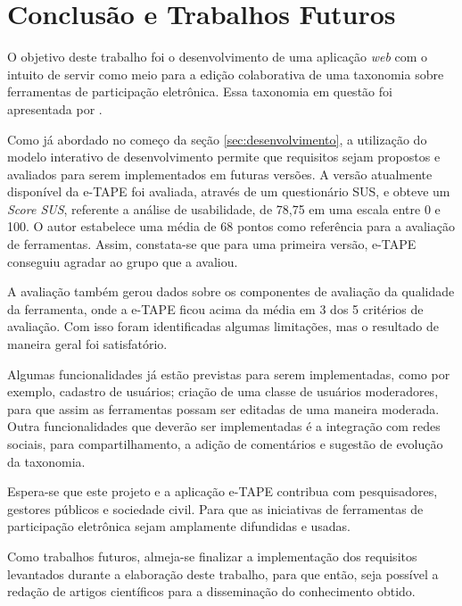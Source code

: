 \chapter[Conclusão e Trabalhos Futuros]{Conclusão e Trabalhos Futuros}
\label{cap:cap5}

O objetivo deste trabalho foi o desenvolvimento de uma aplicação \textit{web} com o intuito de servir como meio para a edição colaborativa de uma taxonomia
sobre ferramentas de participação eletrônica. Essa taxonomia em questão foi apresentada por .

\par
Como já abordado no começo da seção \ref{sec:desenvolvimento}, a utilização do modelo interativo de desenvolvimento permite que requisitos sejam propostos e avaliados para serem
implementados em futuras versões. A versão atualmente disponível da e-TAPE foi avaliada, através de um questionário SUS, e obteve um \textit{Score SUS}, referente a análise de usabilidade,
de 78,75 em uma escala entre 0 e 100. O autor  estabelece uma média de 68 pontos como referência para a avaliação de ferramentas. 
Assim, constata-se que para uma primeira versão, e-TAPE conseguiu agradar ao grupo que a avaliou. 

\par
A avaliação também gerou dados sobre os componentes de avaliação da qualidade da ferramenta, onde a e-TAPE ficou acima da média em 3 dos 5 critérios de avaliação. Com isso foram
identificadas algumas limitações, mas o resultado de maneira geral foi satisfatório. 

\par
Algumas funcionalidades já estão previstas para serem implementadas, como por exemplo, cadastro de usuários; criação de uma classe de usuários moderadores,
para que assim as ferramentas possam ser editadas de uma maneira moderada. Outra funcionalidades que deverão ser implementadas é a integração com redes sociais, para compartilhamento, 
a adição de comentários e sugestão de evolução da taxonomia.

\par
Espera-se que este projeto e a aplicação e-TAPE contribua com pesquisadores, gestores públicos e sociedade civil. Para que as iniciativas de ferramentas de participação eletrônica
sejam amplamente difundidas e usadas. 

\par
Como trabalhos futuros, almeja-se finalizar a implementação dos requisitos levantados durante a elaboração deste trabalho, para que então, seja possível a redação de artigos científicos
para a disseminação do conhecimento obtido. 